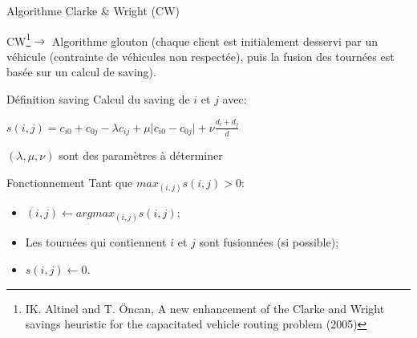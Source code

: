 \documentclass{beamer}
\begin{document}
\begin{frame}{Algorithme Clarke \& Wright (CW)}

CW\footnote{IK. Altinel and T. Öncan, A new enhancement of the Clarke and Wright savings heuristic for the capacitated vehicle routing problem (2005)}$\rightarrow$ Algorithme glouton (chaque client est initialement desservi par un véhicule (contrainte de véhicules non respectée), puis la fusion des tournées est basée sur un calcul de saving). 



\begin{exampleblock}{Définition saving}
Calcul du saving de $i$ et $j$ avec:

\centering
$s(i,j) = c_{i0} + c_{0j} - \lambda c_{ij} + \mu \vert c_{i0} - c_{0j} \vert + \nu \frac{d_i + d_j}{\overline{d}}$

$(\lambda,\mu,\nu)$ sont des paramètres à déterminer
\end{exampleblock}

\begin{block}{Fonctionnement}
Tant que $max_{(i,j)}s(i,j) > 0$:
\begin{itemize}
\item $(i,j) \leftarrow argmax_{(i,j)}s(i,j)$;
\item Les tournées qui contiennent $i$ et $j$ sont fusionnées (si possible);
\item $s(i,j) \leftarrow  0$.
\end{itemize} 

\end{block}
\end{frame}
\end{document}
